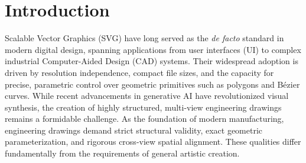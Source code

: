 \documentclass{article}
\begin{document}
\begin{abstract}
Scalable Vector Graphics (SVG) are essential for modern industrial Computer-Aided Design (CAD). However, existing autoregressive SVG generation models are predominantly tailored for artistic creation and struggle to maintain the rigorous geometric fidelity and cross-view spatial alignment required for engineering drawings. To bridge this gap, we introduce \textbf{DrawingsDreamer}, a unified Large Language Model (LLM)-driven framework for multi-view vector-based engineering drawings generation. By formulating the generation of multi-view engineering drawings purely as a sequence modeling task, we eliminate the need of raster image encoders. We propose a Streamlined Representation utilizing hierarchical postfix tokenization, which guides the model to establish local geometric coordinates before assigning semantic boundaries. Optimized via a progressive task-aware curriculum schedule, \textbf{DrawingsDreamer} effectively transitions from localized structural repair to macroscopic generation in a unified model. Extensive experiments demonstrate that our unified model achieves strong performance in both geometric fidelity and syntactic accuracy across diverse conditional and unconditional generation tasks.
\end{abstract}


\section{Introduction}

Scalable Vector Graphics (SVG) have long served as the \textit{de facto} standard in modern digital design, spanning applications from user interfaces (UI) to complex industrial Computer-Aided Design (CAD) systems. Their widespread adoption is driven by resolution independence, compact file sizes, and the capacity for precise, parametric control over geometric primitives such as polygons and Bézier curves. While recent advancements in generative AI have revolutionized visual synthesis, the creation of highly structured, multi-view engineering drawings remains a formidable challenge. As the foundation of modern manufacturing, engineering drawings demand strict structural validity, exact geometric parameterization, and rigorous cross-view spatial alignment. These qualities differ fundamentally from the requirements of general artistic creation.
\end{document}
